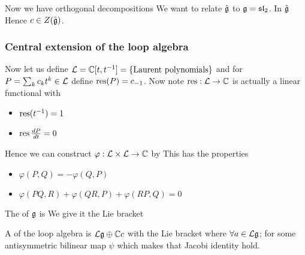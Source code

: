 \documentclass{article}
\begin{document}
Now we have orthogonal decompositions 
We want to relate $\hat{\mathfrak{g}}$ to $\mathfrak{g} = \mathfrak{sl}_2$. In $\hat{\mathfrak{g}}$
Hence $c \in Z(\hat{\mathfrak{g}})$. 

\subsubsection{Central extension of the loop algebra}
Now let us define $\mathcal{L} = \mathbb{C}[t,t^{-1}] = \left\{ \text{Laurent polynomials} \right\}$ and for $P = \sum_{k} c_k t^k \in \mathcal{L}$ define $\operatorname{res}(P) = c_{-1}$. Now note $\operatorname{res} : \mathcal{L} \to \mathbb{C}$ is actually a linear functional with \begin{itemize}
    \item $\operatorname{res}(t^{-1}) = 1$ 
    \item $\operatorname{res} \frac{dP}{dt} = 0$
\end{itemize}
Hence we can construct $\varphi : \mathcal{L} \times \mathcal{L} \to \mathbb{C}$ by 
This has the properties 
\begin{itemize}
    \item $\varphi(P,Q) = - \varphi(Q,P)$
    \item $\varphi(PQ,R) + \varphi(QR,P) + \varphi(RP,Q) = 0$
\end{itemize}

\begin{definition}
The  of $\mathfrak{g}$ is 
We give it the Lie bracket 
\end{definition}

\begin{definition}
A  of the loop algebra is $\mathcal{L}\mathfrak{g} \oplus \mathbb{C}c$ with the Lie bracket where $\forall a \in \mathcal{L}\mathfrak{g}$;
for some antisymmetric bilinear map $\psi$ which makes that Jacobi identity hold. 
\end{definition}
\end{document}
